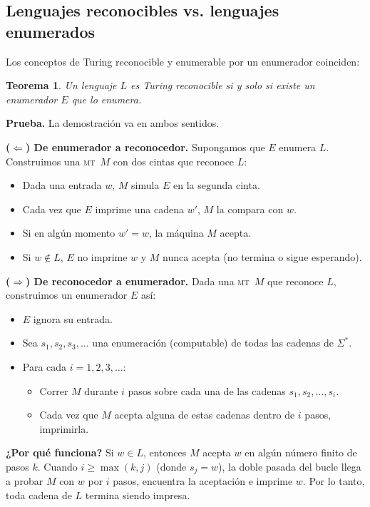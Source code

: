 \documentclass[11pt,a4paper]{article}
\theoremstyle{definicion}
\newtheorem{teorema}[definicion]{Teorema}
\newcommand{\MT}{\textsc{mt}}
\begin{document}
\subsection{Lenguajes reconocibles vs. lenguajes enumerados}

Los conceptos de Turing reconocible y enumerable por un enumerador coinciden:

\begin{teorema}
Un lenguaje $L$ es Turing reconocible si y solo si existe un enumerador $E$ que lo enumera.
\end{teorema}

\textbf{Prueba.} La demostración va en ambos sentidos.

\textbf{($\Leftarrow$) De enumerador a reconocedor.} Supongamos que $E$ enumera $L$. Construimos una \MT\ $M$ con dos cintas que reconoce $L$:
\begin{itemize}
    \item Dada una entrada $w$, $M$ simula $E$ en la segunda cinta.
    \item Cada vez que $E$ imprime una cadena $w'$, $M$ la compara con $w$.
    \item Si en algún momento $w' = w$, la máquina $M$ acepta.
    \item Si $w \notin L$, $E$ no imprime $w$ y $M$ nunca acepta (no termina o sigue esperando).
\end{itemize}

\textbf{($\Rightarrow$) De reconocedor a enumerador.} Dada una \MT\ $M$ que reconoce $L$, construimos un enumerador $E$ así:
\begin{itemize}
    \item $E$ ignora su entrada.
    \item Sea $s_1, s_2, s_3, \dots$ una enumeración (computable) de todas las cadenas de $\Sigma^*$.
    \item Para cada $i = 1, 2, 3, \dots$:
    \begin{itemize}
        \item Correr $M$ durante $i$ pasos sobre cada una de las cadenas $s_1, s_2, \dots, s_i$.
        \item Cada vez que $M$ acepta alguna de estas cadenas dentro de $i$ pasos, imprimirla.
    \end{itemize}
\end{itemize}

\textbf{¿Por qué funciona?} Si $w \in L$, entonces $M$ acepta $w$ en algún número finito de pasos $k$. Cuando $i \geq \max(k, j)$ (donde $s_j = w$), la doble pasada del bucle llega a probar $M$ con $w$ por $i$ pasos, encuentra la aceptación e imprime $w$. Por lo tanto, toda cadena de $L$ termina siendo impresa.
\end{document}
